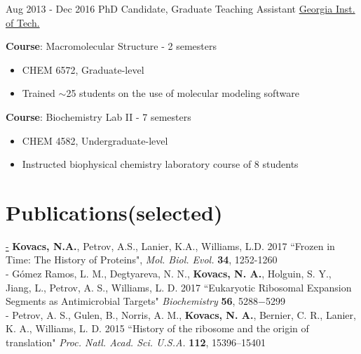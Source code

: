 \documentclass[letterpaper]{twentysecondcv} %
\begin{document}
\begin{twenty}
        	\twentyitem
    	{Aug 2013 -}
		{Dec 2016}
        {PhD Candidate, Graduate Teaching Assistant}
        {\href{https://ww2.chemistry.gatech.edu/~lw26/}{Georgia Inst. of Tech.}}
        {}
        {
       	\textbf{Course}: Macromolecular Structure - 2 semesters
        {\begin{itemize}
        \item CHEM 6572, Graduate-level
        \item Trained $\sim$25 students on the use of molecular modeling software
		\end{itemize}}
       	\textbf{Course}: Biochemistry Lab II - 7 semesters
        {\begin{itemize}
        \item CHEM 4582, Undergraduate-level
        \item Instructed biophysical chemistry laboratory course of 8 students
 \vspace{2mm}
		\end{itemize}}
        }
\end{twenty}


\section{Publications\scriptsize{(selected)}}\href{https://scholar.google.com/citations?user=KIFFrX4AAAAJ&hl=en}
- {\bf Kovacs, N.A.}, Petrov, A.S., Lanier, K.A., Williams, L.D. 2017 ``Frozen in Time: The History of Proteins", {\it Mol. Biol. Evol.} {\bf 34}, 1252-1260\vspace{2.0mm}\\
- Gómez Ramos, L. M., Degtyareva, N. N., {\bf Kovacs, N. A.}, Holguin, S. Y., Jiang, L., Petrov, A. S., Williams, L. D. 2017 ``Eukaryotic Ribosomal Expansion Segments as Antimicrobial Targets" {\it Biochemistry} {\bf 56}, 5288−5299\vspace{2.0mm}\\
- Petrov, A. S., Gulen, B., Norris, A. M., {\bf Kovacs, N. A.}, Bernier, C. R., Lanier, K. A., Williams, L. D. 2015 ``History of the ribosome and the origin of translation" {\it Proc. Natl. Acad. Sci. U.S.A.} {\bf 112}, 15396–15401\\

\end{document}
